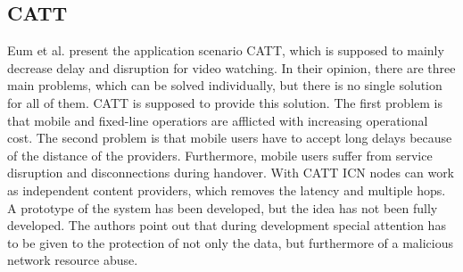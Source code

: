 \subsection{CATT}
Eum et al. present the application scenario CATT, which is supposed to mainly decrease delay and disruption for video watching. In their opinion, there are three main problems, which can be solved individually, but there is no single solution for all of them. CATT is supposed to provide this solution. The first problem is that mobile and fixed-line operatiors are afflicted with increasing operational cost. The second problem is that mobile users have to accept long delays because of the distance of the providers. Furthermore, mobile users suffer from service disruption and disconnections during handover. With CATT ICN nodes can work as independent content providers, which removes the latency and multiple hops. \\
A prototype of the system has been developed, but the idea has not been fully developed. The authors point out that during development special attention has to be given to the protection of not only the data, but furthermore of a malicious network resource abuse.  \cite{Eum:2015:DII:2803530.2803728}
